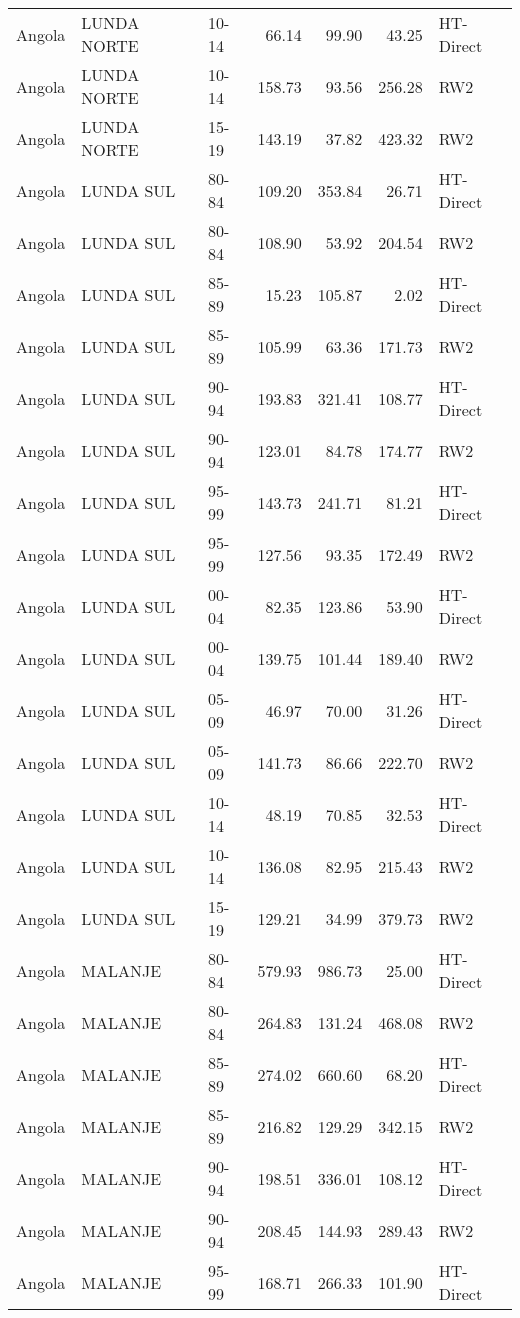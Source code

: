 \begin{longtable}{lllrrrl}
  Angola & LUNDA NORTE & 10-14 & 66.14 & 99.90 & 43.25 & HT-Direct \\ 
  Angola & LUNDA NORTE & 10-14 & 158.73 & 93.56 & 256.28 & RW2 \\ 
  Angola & LUNDA NORTE & 15-19 & 143.19 & 37.82 & 423.32 & RW2 \\ 
  Angola & LUNDA SUL & 80-84 & 109.20 & 353.84 & 26.71 & HT-Direct \\ 
  Angola & LUNDA SUL & 80-84 & 108.90 & 53.92 & 204.54 & RW2 \\ 
  Angola & LUNDA SUL & 85-89 & 15.23 & 105.87 & 2.02 & HT-Direct \\ 
  Angola & LUNDA SUL & 85-89 & 105.99 & 63.36 & 171.73 & RW2 \\ 
  Angola & LUNDA SUL & 90-94 & 193.83 & 321.41 & 108.77 & HT-Direct \\ 
  Angola & LUNDA SUL & 90-94 & 123.01 & 84.78 & 174.77 & RW2 \\ 
  Angola & LUNDA SUL & 95-99 & 143.73 & 241.71 & 81.21 & HT-Direct \\ 
  Angola & LUNDA SUL & 95-99 & 127.56 & 93.35 & 172.49 & RW2 \\ 
  Angola & LUNDA SUL & 00-04 & 82.35 & 123.86 & 53.90 & HT-Direct \\ 
  Angola & LUNDA SUL & 00-04 & 139.75 & 101.44 & 189.40 & RW2 \\ 
  Angola & LUNDA SUL & 05-09 & 46.97 & 70.00 & 31.26 & HT-Direct \\ 
  Angola & LUNDA SUL & 05-09 & 141.73 & 86.66 & 222.70 & RW2 \\ 
  Angola & LUNDA SUL & 10-14 & 48.19 & 70.85 & 32.53 & HT-Direct \\ 
  Angola & LUNDA SUL & 10-14 & 136.08 & 82.95 & 215.43 & RW2 \\ 
  Angola & LUNDA SUL & 15-19 & 129.21 & 34.99 & 379.73 & RW2 \\ 
  Angola & MALANJE & 80-84 & 579.93 & 986.73 & 25.00 & HT-Direct \\ 
  Angola & MALANJE & 80-84 & 264.83 & 131.24 & 468.08 & RW2 \\ 
  Angola & MALANJE & 85-89 & 274.02 & 660.60 & 68.20 & HT-Direct \\ 
  Angola & MALANJE & 85-89 & 216.82 & 129.29 & 342.15 & RW2 \\ 
  Angola & MALANJE & 90-94 & 198.51 & 336.01 & 108.12 & HT-Direct \\ 
  Angola & MALANJE & 90-94 & 208.45 & 144.93 & 289.43 & RW2 \\ 
  Angola & MALANJE & 95-99 & 168.71 & 266.33 & 101.90 & HT-Direct \\ 

\end{longtable}

